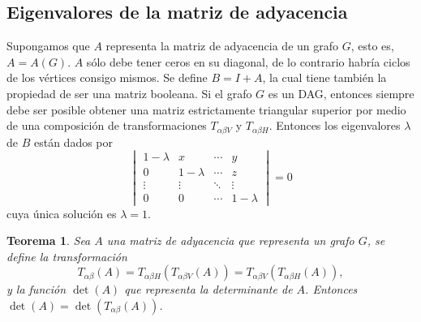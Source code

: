 \documentclass[10pt,a4paper]{article}
\newtheorem{teorema1}{Teorema}
\begin{document}
\subsection{Eigenvalores de la matriz de adyacencia}
Supongamos que $A$ representa la matriz de adyacencia de un grafo $G$, esto es, $A = A (G)$. $A$ sólo debe tener ceros en su diagonal, de lo contrario habría ciclos de los vértices consigo mismos. Se define $B = I + A$, la cual tiene también la propiedad de ser una matriz booleana. Si el grafo $G$ es un DAG, entonces siempre debe ser posible obtener una matriz estrictamente triangular superior por medio de una composición de transformaciones $T_{\alpha \beta V}$ y $T_{\alpha \beta H}$. Entonces los eigenvalores $\lambda$ de $B$ están dados por
\[
 \begin{vmatrix}
  1 - \lambda & x & \cdots & y \\
  0 & 1 - \lambda & \cdots & z \\
  \vdots  & \vdots  & \ddots & \vdots  \\
  0 & 0 & \cdots & 1 - \lambda 
 \end{vmatrix} = 0
\]
cuya única solución es $\lambda = 1$.

\begin{teorema1}
Sea $A$ una matriz de adyacencia que representa un grafo $G$, se define la transformación
\[
T_{\alpha \beta} (A) = T_{\alpha \beta H}(T_{\alpha \beta V}(A)) = T_{\alpha \beta V}(T_{\alpha \beta H}(A)),
\]
y la función $\operatorname{det}(A)$ que representa la determinante de $A$. Entonces
$\operatorname{det}(A) = \operatorname{det}(T_{\alpha \beta} (A))$.
\end{teorema1}
\end{document}
